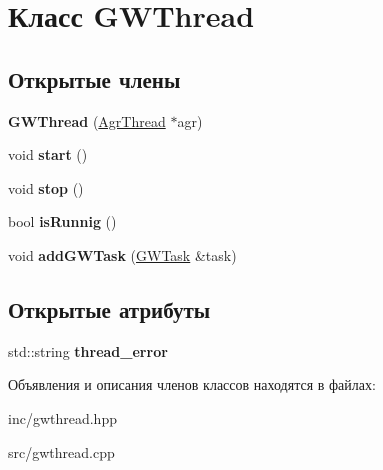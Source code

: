 \hypertarget{classGWThread}{}\section{Класс G\+W\+Thread}
\label{classGWThread}
\subsection*{Открытые члены}
\begin{DoxyCompactItemize}
\item 
\mbox{\label{classGWThread_a17ab1c55ab7c113a9422091103ee4a94}} 
{\bfseries G\+W\+Thread} (\hyperlink{classAgrThread}{Agr\+Thread} $\ast$agr)
\item 
\mbox{\label{classGWThread_a213970ae436ad7ed34f25ef3ec111ee6}} 
void {\bfseries start} ()
\item 
\mbox{\label{classGWThread_a92d73aa5a88ec42353aef90041bd5a84}} 
void {\bfseries stop} ()
\item 
\mbox{\label{classGWThread_ae579300486967f67e1539d29af919056}} 
bool {\bfseries is\+Runnig} ()
\item 
\mbox{\label{classGWThread_a29349a2536b59b5725d847394103d081}} 
void {\bfseries add\+G\+W\+Task} (\hyperlink{classGWTask}{G\+W\+Task} \&task)
\end{DoxyCompactItemize}
\subsection*{Открытые атрибуты}
\begin{DoxyCompactItemize}
\item 
\mbox{\label{classGWThread_a1d7e6882391aa132c708cd1b178bfb82}} 
std\+::string {\bfseries thread\+\_\+error}
\end{DoxyCompactItemize}


Объявления и описания членов классов находятся в файлах\+:\begin{DoxyCompactItemize}
\item 
inc/gwthread.\+hpp\item 
src/gwthread.\+cpp\end{DoxyCompactItemize}
